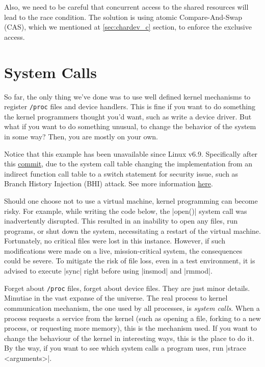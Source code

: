 \documentclass[10pt, oneside]{book}
\begin{document}
Also, we need to be careful that concurrent access to the shared resources will lead to the race condition.
The solution is using atomic Compare-And-Swap (CAS), which we mentioned at \ref{sec:chardev_c} section, to enforce the exclusive access.




\section{System Calls}
\label{sec:syscall}
So far, the only thing we've done was to use well defined kernel mechanisms to register \verb|/proc| files and device handlers.
This is fine if you want to do something the kernel programmers thought you'd want, such as write a device driver.
But what if you want to do something unusual, to change the behavior of the system in some way?
Then, you are mostly on your own.

Notice that this example has been unavailable since Linux v6.9.
Specifically after this \href{https://github.com/torvalds/linux/commit/1e3ad78334a69b36e107232e337f9d693dcc9df2#diff-4a16bf89a09b4f49669a30d54540f0b936ea0224dc6ee9edfa7700deb16c3e11R52}{commit}, due to the system call table changing the implementation from an indirect function call table to a switch statement for security issue, such as Branch History Injection (BHI) attack.
See more information \href{https://bugs.launchpad.net/ubuntu/+source/linux/+bug/2060909}{here}.

Should one choose not to use a virtual machine, kernel programming can become risky.
For example, while writing the code below, the \cpp|open()| system call was inadvertently disrupted.
This resulted in an inability to open any files, run programs, or shut down the system, necessitating a restart of the virtual machine.
Fortunately, no critical files were lost in this instance.
However, if such modifications were made on a live, mission-critical system, the consequences could be severe.
To mitigate the risk of file loss, even in a test environment, it is advised to execute \sh|sync| right before using \sh|insmod| and \sh|rmmod|.

Forget about \verb|/proc| files, forget about device files.
They are just minor details.
Minutiae in the vast expanse of the universe.
The real process to kernel communication mechanism, the one used by all processes, is \emph{system calls}.
When a process requests a service from the kernel (such as opening a file, forking to a new process, or requesting more memory), this is the mechanism used.
If you want to change the behaviour of the kernel in interesting ways, this is the place to do it.
By the way, if you want to see which system calls a program uses, run \sh|strace <arguments>|.
\end{document}
